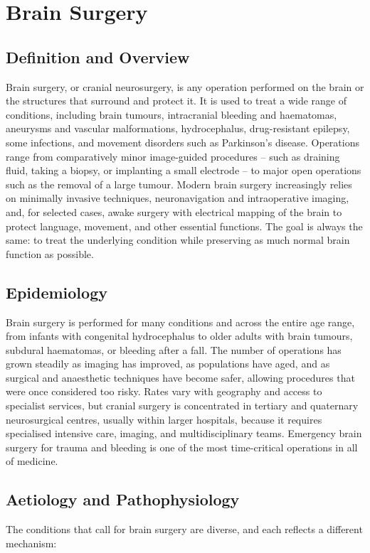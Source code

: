 \chapter{Brain Surgery}

\section*{Definition and Overview}
Brain surgery, or cranial neurosurgery, is any operation performed on the brain or the structures that surround and protect it. It is used to treat a wide range of conditions, including brain tumours, intracranial bleeding and haematomas, aneurysms and vascular malformations, hydrocephalus, drug-resistant epilepsy, some infections, and movement disorders such as Parkinson's disease. Operations range from comparatively minor image-guided procedures -- such as draining fluid, taking a biopsy, or implanting a small electrode -- to major open operations such as the removal of a large tumour. Modern brain surgery increasingly relies on minimally invasive techniques, neuronavigation and intraoperative imaging, and, for selected cases, awake surgery with electrical mapping of the brain to protect language, movement, and other essential functions. The goal is always the same: to treat the underlying condition while preserving as much normal brain function as possible.

\section*{Epidemiology}
Brain surgery is performed for many conditions and across the entire age range, from infants with congenital hydrocephalus to older adults with brain tumours, subdural haematomas, or bleeding after a fall. The number of operations has grown steadily as imaging has improved, as populations have aged, and as surgical and anaesthetic techniques have become safer, allowing procedures that were once considered too risky. Rates vary with geography and access to specialist services, but cranial surgery is concentrated in tertiary and quaternary neurosurgical centres, usually within larger hospitals, because it requires specialised intensive care, imaging, and multidisciplinary teams. Emergency brain surgery for trauma and bleeding is one of the most time-critical operations in all of medicine.

\section*{Aetiology and Pathophysiology}
The conditions that call for brain surgery are diverse, and each reflects a different mechanism:

